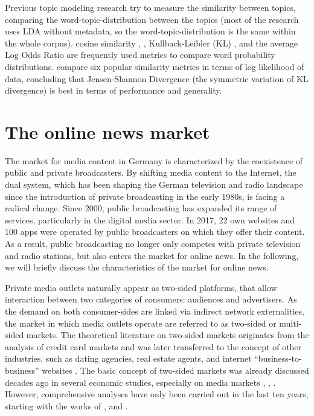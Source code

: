 \documentclass[12pt,a4paper,notitlepage]{article}
\begin{document}
\begin{enumerate}
\begin{enumerate}
		Previous topic modeling research try to measure the similarity between topics, comparing the word-topic-distribution between the topics (most of the research uses LDA without metadata, so the word-topic-distribution is the same within the whole corpus). cosine similarity \citep{he_detecting_2009}, \citep{ramage_labeled_2009}, Kullback-Leibler (KL) \citep{newman_distributed_2009}, \citep{wang_mining_2009} and the average Log Odds Ratio \citep{chaney_visualizing_2012} are frequently used metrics to compare word probability distributions. \citet{kim_topic_2011} compare six popular similarity metrics in terms of log likelihood of data, concluding that Jensen-Shannon Divergence (the symmetric variation of KL divergence) is best in terms of performance and generality. 
		
		\end{enumerate}
	
\end{enumerate}
 
\section{The online news market}\label{ch_onlinenews}

The market for media content in Germany is characterized by the coexistence of public and private broadcasters. By shifting media content to the Internet, the dual system, which has been shaping the German television and radio landscape since the introduction of private broadcasting in the early 1980s, is facing a radical change. Since 2000, public broadcasting has expanded its range of services, particularly in the digital media sector. In 2017, 22 own websites and 100 apps were operated by public broadcasters on which they offer their content. As a result, public broadcasting no longer only competes with private television and radio stations, but also enters the market for online news. In the following, we will briefly discuss the characteristics of the market for online news. 

Private media outlets naturally appear as two-sided platforms, that allow interaction between two categories of consumers: audiences and advertisers. As the demand on both consumer-sides are linked via indirect network externalities, the market in which media outlets operate are referred to as two-sided or multi-sided markets. The theoretical literature on two-sided markets originates from the analysis of credit card markets \citep{rochet_platform_2003} and was later transferred to the concept of other industries, such as dating agencies, real estate agents, and internet “business-to-business” websites \citep{caillaud_chicken_2003}. The basic concept of two-sided markets was already discussed decades ago in several economic studies, especially on media markets \citep{corden_maximisation_1952}, \citep{gustafsson_circulation_1978}, \citep{blair_pricing_1993}. However, comprehensive analyses have only been carried out in the last ten years, starting with the works of \citet{rochet_platform_2003}, \citet{evans_empirical_2003} and \citet{armstrong_competition_2006}.
\end{document}
